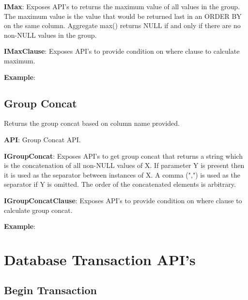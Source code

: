 			\textbf{IMax}:    Exposes API's to returns the maximum value of all values in the group.
						The maximum value is the value that would be returned last in an ORDER BY on the same column. 
						Aggregate max() returns NULL if and only if there are no non-NULL values in the group.


				

			
			\textbf{IMaxClause}: Exposes API's to provide condition on where clause to calculate maximum.
				

			\textbf{Example}: 
				


	\subsection{Group Concat} 
		\par 
		Returns the group concat based on column name provided.

			\textbf{API}: Group Concat API.
				
		
			\textbf{IGroupConcat}:     Exposes API's to get group concat that returns a string which is the concatenation of all non-NULL values of X.
							If parameter Y is present then it is used as the separator between instances of X. A comma (",") is used as the separator if Y is omitted.
							The order of the concatenated elements is arbitrary.


				

			
			\textbf{IGroupConcatClause}: Exposes API's to provide condition on where clause to calculate group concat.
				

			\textbf{Example}: 
				


\section{Database Transaction API's}

	\subsection{Begin Transaction}
	

